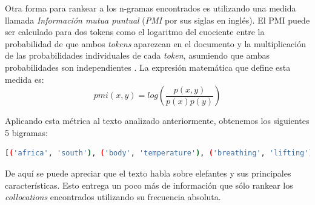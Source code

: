     Otra forma para rankear a los n-gramas encontrados es utilizando una medida llamada \textit{Información mutua puntual} (\textit{PMI} por sus siglas en inglés). El PMI puede ser calculado para dos tokens como el logaritmo del cuociente entre la probabilidad de que ambos \textit{tokens} aparezcan en el documento y la multiplicación de las probabilidades individuales de cada \textit{token}, asumiendo que ambas probabilidades son independientes \cite{church1990word}. La expresión matemática que define esta medida es:
    \begin{equation*}
        pmi(x,y) = log\left(\frac{p(x,y)}{p(x)p(y)}\right)
    \end{equation*}
    
    Aplicando esta métrica al texto analizado anteriormente, obtenemos los siguientes 5 bigramas:
    
    \begin{lstlisting}[language=Bash]
    [('africa', 'south'), ('body', 'temperature'), ('breathing', 'lifting'), ('carry', 'great'), ('control', 'body'), ('convex', 'level'), ('ear', 'flaps'), ('elephantidae', 'order'), ('extant', 'terrestrial'), ('family', 'elephantidae')]
    \end{lstlisting}
    De aquí se puede apreciar que el texto habla sobre elefantes y sus principales características. Esto entrega un poco más de información que sólo rankear los \textit{collocations} encontrados utilizando su frecuencia absoluta.
    
